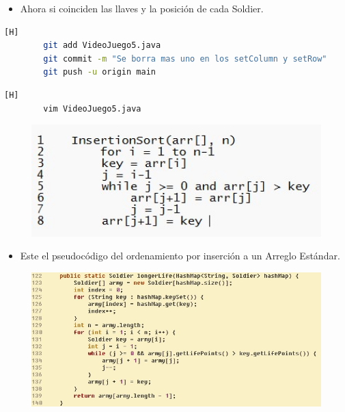 \documentclass{article}
\begin{document}
	\begin{itemize}	
		\item Ahora si coinciden las llaves y la posición de cada Soldier.
	\end{itemize}
	
		
	\begin{lstlisting}[language=bash,caption={Commit: a13e2f09357ac8e78d9aa0a0c1aa9e654a0a09df}][H]
		git add VideoJuego5.java
		git commit -m "Se borra mas uno en los setColumn y setRow"			
		git push -u origin main
	\end{lstlisting}
	
	
	
	\begin{lstlisting}[language=bash,caption={Se modifica el metodo LongerLife}][H]
		vim VideoJuego5.java
	\end{lstlisting}
	
	\begin{figure}[H]
		\centering
		\includegraphics[width=1\textwidth,keepaspectratio]{img/insertion.jpg}
	\end{figure}
	
		\begin{itemize}	
		\item Este el pseudocódigo del ordenamiento por inserción a un Arreglo Estándar.
	\end{itemize}
	
	
	\begin{figure}[H]
		\centering
		\includegraphics[width=1\textwidth,keepaspectratio]{img/longerLife.jpg}
	\end{figure}
	
\end{document}
